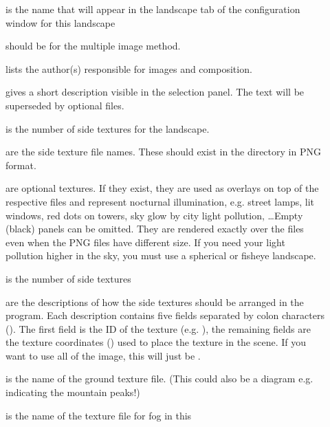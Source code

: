 \begin{description}
\item[] is the name that will appear in the landscape tab of the configuration window for this landscape
\item[] should be  for the multiple image method.
\item[] lists the author(s) responsible for images and composition.
\item[] gives a short description visible in the
  selection panel. The text will be superseded by optional
   files.
\item[] is the number of side textures for the landscape.
\item[] are the side texture file
  names. These should exist in the  directory in PNG format.
\item[] are optional textures. If
  they exist, they are used as overlays on top of the respective
   files and represent nocturnal illumination,
  e.g. street lamps, lit windows, red dots on towers, sky glow by city
  light pollution, \ldots Empty (black) panels can be omitted. They
  are rendered exactly over the  files even when the PNG
  files have different size. If you need your light pollution higher in
  the sky, you must use a spherical or fisheye
  landscape.%
\item[] is the number of side textures
\item[] are the descriptions of how
  the side textures should be arranged in the program. Each
  description contains five fields separated by colon characters
  (\var{:}). The first field is the ID of the texture
  (e.g. ), the remaining fields are the texture coordinates
  () used to place the texture in the scene. If you
  want to use all of the image, this will just be .
\item[] is the name of the ground texture file. (This
  could also be a diagram e.g. indicating the mountain peaks!)
\item[] is the name of the texture file for fog in this

\end{description}
